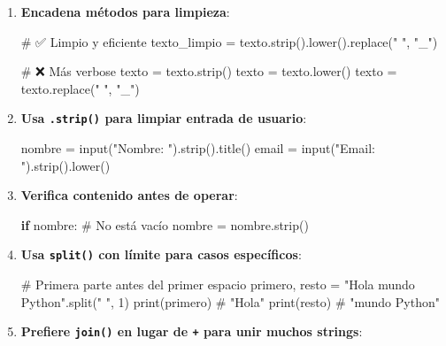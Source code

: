 \documentclass[
  doc,
  floatsintext,
  longtable,
  a4paper,
  nolmodern,
  notxfonts,
  notimes,
  12pt,
  colorlinks=true,linkcolor=blue,citecolor=blue,urlcolor=blue]{apa7}
\newenvironment{Shaded}{\begin{snugshade}}{\end{snugshade}}
\newcommand{\BuiltInTok}[1]{\textcolor[rgb]{0.00,0.23,0.31}{#1}}
\newcommand{\CommentTok}[1]{\textcolor[rgb]{0.37,0.37,0.37}{#1}}
\newcommand{\ControlFlowTok}[1]{\textcolor[rgb]{0.00,0.23,0.31}{\textbf{#1}}}
\newcommand{\DecValTok}[1]{\textcolor[rgb]{0.68,0.00,0.00}{#1}}
\newcommand{\NormalTok}[1]{\textcolor[rgb]{0.00,0.23,0.31}{#1}}
\newcommand{\OperatorTok}[1]{\textcolor[rgb]{0.37,0.37,0.37}{#1}}
\newcommand{\StringTok}[1]{\textcolor[rgb]{0.13,0.47,0.30}{#1}}
\begin{document}
\begin{enumerate}
\def\labelenumi{\arabic{enumi}.}
\item
  \textbf{Encadena métodos para limpieza}:

\begin{Shaded}
\begin{Highlighting}[]
\CommentTok{\# ✅ Limpio y eficiente}
\NormalTok{texto\_limpio }\OperatorTok{=}\NormalTok{ texto.strip().lower().replace(}\StringTok{" "}\NormalTok{, }\StringTok{"\_"}\NormalTok{)}

\CommentTok{\# ❌ Más verbose}
\NormalTok{texto }\OperatorTok{=}\NormalTok{ texto.strip()}
\NormalTok{texto }\OperatorTok{=}\NormalTok{ texto.lower()}
\NormalTok{texto }\OperatorTok{=}\NormalTok{ texto.replace(}\StringTok{" "}\NormalTok{, }\StringTok{"\_"}\NormalTok{)}
\end{Highlighting}
\end{Shaded}
\item
  \textbf{Usa \texttt{.strip()} para limpiar entrada de usuario}:

\begin{Shaded}
\begin{Highlighting}[]
\NormalTok{nombre }\OperatorTok{=} \BuiltInTok{input}\NormalTok{(}\StringTok{"Nombre: "}\NormalTok{).strip().title()}
\NormalTok{email }\OperatorTok{=} \BuiltInTok{input}\NormalTok{(}\StringTok{"Email: "}\NormalTok{).strip().lower()}
\end{Highlighting}
\end{Shaded}
\item
  \textbf{Verifica contenido antes de operar}:

\begin{Shaded}
\begin{Highlighting}[]
\ControlFlowTok{if}\NormalTok{ nombre:  }\CommentTok{\# No está vacío}
\NormalTok{    nombre }\OperatorTok{=}\NormalTok{ nombre.strip()}
\end{Highlighting}
\end{Shaded}
\item
  \textbf{Usa \texttt{split()} con límite para casos específicos}:

\begin{Shaded}
\begin{Highlighting}[]
\CommentTok{\# Primera parte antes del primer espacio}
\NormalTok{primero, resto }\OperatorTok{=} \StringTok{"Hola mundo Python"}\NormalTok{.split(}\StringTok{" "}\NormalTok{, }\DecValTok{1}\NormalTok{)}
\BuiltInTok{print}\NormalTok{(primero)  }\CommentTok{\# "Hola"}
\BuiltInTok{print}\NormalTok{(resto)    }\CommentTok{\# "mundo Python"}
\end{Highlighting}
\end{Shaded}
\item
  \textbf{Prefiere \texttt{join()} en lugar de \texttt{+} para unir
  muchos strings}:


\end{enumerate}
\end{document}
